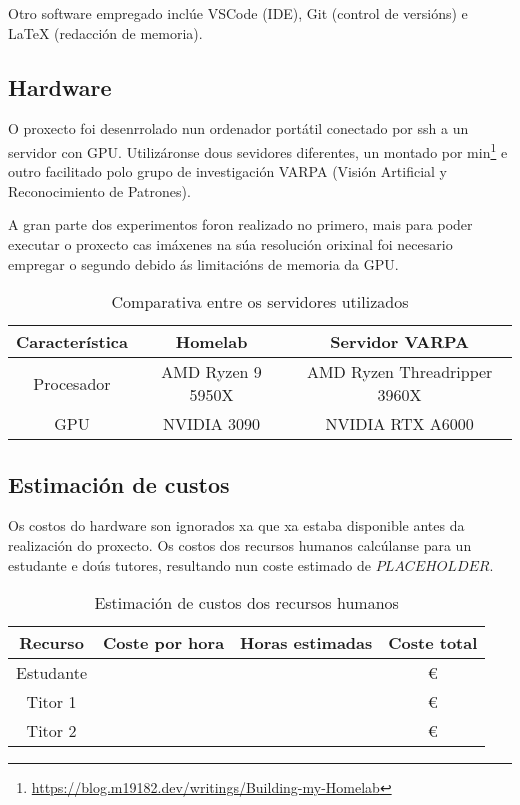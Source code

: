 Otro software empregado inclúe VSCode (IDE), Git (control de versións) e LaTeX (redacción de memoria).

\subsection{Hardware}
\label{subsec:Hardware}

O proxecto foi desenrrolado nun ordenador portátil conectado por ssh a un servidor con GPU. 
Utilizáronse dous sevidores diferentes, un montado por min\footnote{\url{https://blog.m19182.dev/writings/Building-my-Homelab}} e outro facilitado polo grupo de investigación VARPA (Visión Artificial y Reconocimiento de Patrones).

A gran parte dos experimentos foron realizado no primero, mais para poder executar o proxecto cas imáxenes na súa resolución orixinal foi necesario empregar o segundo 
debido ás limitacións de memoria da GPU. 

\begin{table}[h]
\centering
\begin{tabular}{|c|c|c|}
\hline
\textbf{Característica} & \textbf{Homelab} & \textbf{Servidor VARPA} \\ \hline
Procesador & AMD Ryzen 9 5950X&  AMD Ryzen Threadripper 3960X \\ \hline
GPU & NVIDIA 3090 & NVIDIA RTX A6000  \\ \hline
\end{tabular}
\caption{Comparativa entre os servidores utilizados}
\label{tab:comparativa_servidores}
\end{table}


\subsection{Estimación de custos}
\label{subsec:Estimación de custos}

Os costos do hardware son ignorados xa que xa estaba disponible antes da realización do proxecto.
Os costos dos recursos humanos calcúlanse para un estudante e doús tutores, resultando nun coste estimado de $PLACEHOLDER$.

\begin{table}[h]
\centering
\begin{tabular}{|c|c|c|c|}
\hline
\textbf{Recurso} & \textbf{Coste por hora} &\textbf{Horas estimadas} & \textbf{Coste total} \\ \hline
Estudante & & & € \\ \hline
Titor 1 & & & € \\ \hline
Titor 2 & & & € \\ \hline
\end{tabular}
\caption{Estimación de custos dos recursos humanos}
\label{tab:estimacion_custos}
\end{table}